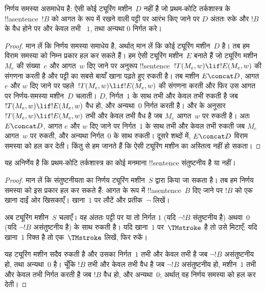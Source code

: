 \documentclass[../../../include/open-logic-section]{subfiles}
\begin{document}

\begin{thm}
निर्णय समस्या असमाधेय है: ऐसी कोई ट्यूरिंग मशीन~$D$ नहीं है जो
प्रथम-कोटि तर्कशास्त्र के !!a{sentence}~$!B$ को आगत के रूप में रखने वाली
पट्टी पर आरंभ किए जाने पर $D$ अंततः रुके और $!B$ के वैध होने पर और केवल तभी
~$1$, तथा अन्यथा $0$ निर्गत करे।
\end{thm}

\begin{proof}
मान लें कि निर्णय समस्या समाधेय है, अर्थात् मान लें कि कोई ट्यूरिंग
मशीन~$D$ है। तब हम विराम समस्या को निम्न प्रकार हल कर सकते हैं। हम ऐसी
ट्यूरिंग मशीन~$E$ बनाते हैं जो ट्यूरिंग मशीन~$M_e$ की संख्या~$e$ और
आगत~$w$ दिए जाने पर अनुरूप !!{sentence}~$!T(M_e, w) \lif !E(M_e, w)$
की संगणना करती है और पट्टी का सबसे बायाँ खाना पढ़ते हुए रुकती है। तब
मशीन $E \concat D$, आगत $e$ और $w$ दिए जाने पर पहले~$!T(M_e, w) \lif
!E(M_e, w)$ की संगणना करती और फिर उस आगत पर निर्णय-समस्या मशीन~$D$
चलाती। $D$, निर्गत~$1$ के साथ तभी और केवल तभी रुकती है जब
$!T(M_e, w) \lif !E(M_e, w)$ वैध हो, और अन्यथा~$0$ निर्गत करती है।
 और  के
अनुसार $!T(M_e, w) \lif !E(M_e, w)$ तभी और केवल तभी वैध है जब $M_e$
आगत~$w$ पर रुकती है। अतः $E\concat D$, आगत $e$ और $w$ दिए जाने पर
निर्गत~$1$ के साथ तभी और केवल तभी रुकती जब $M_e$ आगत~$w$ पर रुकती, और
अन्यथा निर्गत~$0$ के साथ रुकती। दूसरे शब्दों में, $E \concat D$ विराम
समस्या को हल कर देती। किंतु  से हम जानते
हैं कि ऐसी ट्यूरिंग मशीन का अस्तित्व नहीं हो सकता।
\end{proof}

\begin{cor}%
यह अनिर्णेय है कि प्रथम-कोटि तर्कशास्त्र का कोई मनमाना !!{sentence}
संतुष्टनीय है या नहीं।
\end{cor}

\begin{proof}
  मान लें कि संतुष्टनीयता का निर्णय ट्यूरिंग मशीन~$S$ द्वारा किया जा
  सकता है। तब हम निर्णय समस्या को इस प्रकार हल कर सकते हैं: आगत के रूप
  में !!a{sentence}~$B$ दिए जाने पर $!B$ को एक खाना दाईं ओर खिसकाएँ।
  खाना~$1$ पर लौटें और प्रतीक~$\lnot$ लिखें।

  अब ट्यूरिंग मशीन~$S$ चलाएँ। वह अंततः पट्टी पर या तो निर्गत $1$ (यदि
  $\lnot !B$ संतुष्टनीय है) अथवा~$0$ (यदि $\lnot !B$ असंतुष्टनीय है) के
  साथ रुकती है। यदि खाना~$1$ पर~$\TMstroke$ है तो उसे मिटाएँ; यदि
  खाना~$1$ रिक्त है तो एक~$\TMstroke$ लिखें, फिर रुकें।

  यह ट्यूरिंग मशीन सदैव रुकती है और उसका निर्गत~$1$ तभी और केवल तभी है
  जब $\lnot !B$ असंतुष्टनीय हो, तथा अन्यथा~$0$ है। चूँकि $!B$ तभी और
  केवल तभी वैध है जब $\lnot !B$ असंतुष्टनीय हो, मशीन~$1$ तभी और केवल
  तभी निर्गत करती है जब $!B$ वैध हो, और अन्यथा~$0$; अर्थात् वह निर्णय
  समस्या को हल कर देती।
\end{proof}
\end{document}
